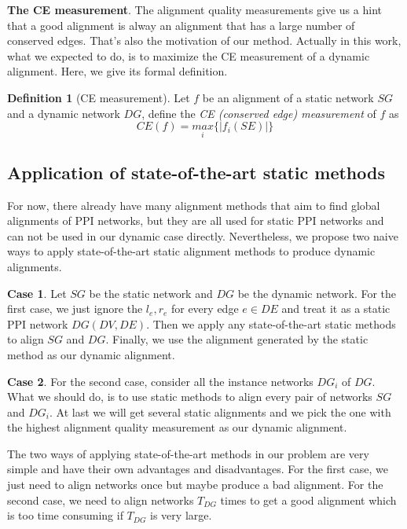 \documentclass{bioinfo}
\theoremstyle{definition}
\newtheorem{defn}{\textbf{Definition}}[section]%
\begin{document}
\begin{methods}
\textbf{The CE measurement}. The alignment quality measurements give us a hint that a good alignment is alway an alignment that has a large number of conserved edges. That's also the motivation of our method. Actually in this work, what we expected to do, is to maximize the CE measurement of a dynamic alignment. Here, we give its formal definition.

\begin{defn}[CE measurement]
\label{defnce}
Let $f$ be an alignment of a static network $SG$ and a dynamic network $DG$, define the \textit{CE (conserved edge) measurement} of $f$ as 
$$CE(f)=\underset{i}{max}\{ |f_i(SE)|\}$$
\end{defn}

\subsection{Application of state-of-the-art static methods}
For now, there already have many alignment methods that aim to find global alignments of PPI networks, but they are all used for static PPI networks and can not be used in our dynamic case directly. Nevertheless, we propose two naive ways to apply state-of-the-art static alignment methods to produce dynamic alignments.

\textbf{Case 1}. Let $SG$ be the static network and $DG$ be the dynamic network. For the first case, we just ignore the $l_e,r_e$ for every edge $e\in DE$ and treat it as a static PPI network $DG(DV,DE)$. Then we apply any state-of-the-art static methods to align $SG$ and $DG$. Finally, we use the alignment generated by the static method as our dynamic alignment.

\textbf{Case 2}. For the second case, consider all the instance networks $DG_i$ of $DG$. What we should do, is to use static methods to align every pair of networks $SG$ and $DG_i$. At last we will get several static alignments and we pick the one with the highest alignment quality measurement as our dynamic alignment.

The two ways of applying state-of-the-art methods in our problem are very simple and have their own advantages and disadvantages. For the first case, we just need to align networks once but maybe produce a bad alignment. For the second case, we need to align networks $T_{DG}$ times to get a good alignment which is too time consuming if $T_{DG}$ is very large.


\end{methods}
\end{document}
